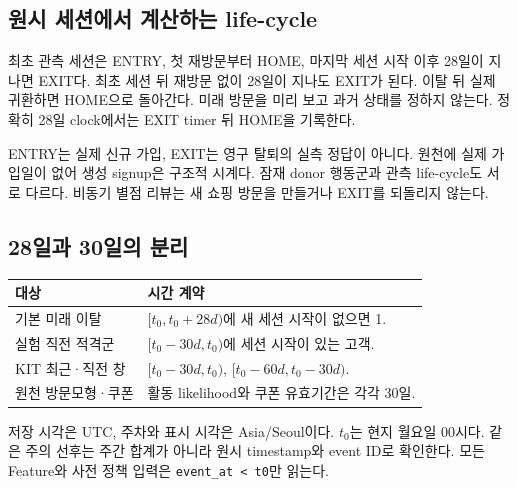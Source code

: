 \documentclass[11pt,a4paper]{article}
\newcommand{\code}[1]{{\ttfamily\footnotesize\nolinkurl{#1}}}
\newcommand{\thead}{\rowcolor{pale}}
\begin{document}
\subsection{원시 세션에서 계산하는 life-cycle}
\begin{center}
\end{center}
최초 관측 세션은 ENTRY, 첫 재방문부터 HOME, 마지막 세션 시작 이후 28일이 지나면 EXIT다. 최초 세션 뒤 재방문 없이 28일이 지나도 EXIT가 된다. 이탈 뒤 실제 귀환하면 HOME으로 돌아간다. 미래 방문을 미리 보고 과거 상태를 정하지 않는다. 정확히 28일 clock에서는 EXIT timer 뒤 HOME을 기록한다.

ENTRY는 실제 신규 가입, EXIT는 영구 탈퇴의 실측 정답이 아니다. 원천에 실제 가입일이 없어 생성 signup은 구조적 시계다. 잠재 donor 행동군과 관측 life-cycle도 서로 다르다. 비동기 별점 리뷰는 새 쇼핑 방문을 만들거나 EXIT를 되돌리지 않는다.

\subsection{28일과 30일의 분리}
\begin{tabularx}{\linewidth}{@{}P{.33\linewidth}Y@{}}\thead 대상 & 시간 계약\\\midrule
기본 미래 이탈 & $[t_0,t_0+28d)$에 새 세션 시작이 없으면 1.\\
실험 직전 적격군 & $[t_0-30d,t_0)$에 세션 시작이 있는 고객.\\
KIT 최근·직전 창 & $[t_0-30d,t_0)$, $[t_0-60d,t_0-30d)$.\\
원천 방문모형·쿠폰 & 활동 likelihood와 쿠폰 유효기간은 각각 30일.\\\bottomrule\end{tabularx}

저장 시각은 UTC, 주차와 표시 시각은 Asia/Seoul이다. $t_0$는 현지 월요일 00시다. 같은 주의 선후는 주간 합계가 아니라 원시 timestamp와 event ID로 확인한다. 모든 Feature와 사전 정책 입력은 \code{event_at < t0}만 읽는다.
\end{document}
